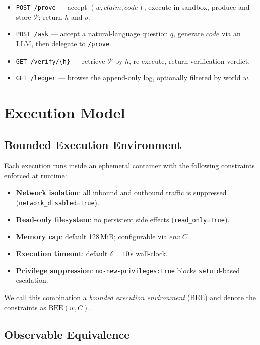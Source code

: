 \documentclass[11pt]{article}
\begin{document}
\begin{itemize}
  \item \texttt{POST /prove} — accept $(w, \textit{claim}, \textit{code})$,
        execute in sandbox, produce and store $\mathcal{P}$; return $h$ and
        $\sigma$.
  \item \texttt{POST /ask} — accept a natural-language question $q$,
        generate $\textit{code}$ via an LLM, then delegate to
        \texttt{/prove}.
  \item \texttt{GET /verify/\{h\}} — retrieve $\mathcal{P}$ by $h$,
        re-execute, return verification verdict.
  \item \texttt{GET /ledger} — browse the append-only log, optionally
        filtered by world $w$.
\end{itemize}

\section{Execution Model}
\label{sec:execution}

\subsection{Bounded Execution Environment}

Each execution runs inside an ephemeral container with the following
constraints enforced at runtime:

\begin{itemize}
  \item \textbf{Network isolation}: all inbound and outbound traffic is
        suppressed (\texttt{network\_disabled=True}).
  \item \textbf{Read-only filesystem}: no persistent side effects
        (\texttt{read\_only=True}).
  \item \textbf{Memory cap}: default 128\,MiB; configurable via
        $\textit{env}.C$.
  \item \textbf{Execution timeout}: default $\delta = 10$\,s wall-clock.
  \item \textbf{Privilege suppression}: \texttt{no-new-privileges:true}
        blocks \texttt{setuid}-based escalation.
\end{itemize}

We call this combination a \emph{bounded execution environment} (BEE)
and denote the constraints as $\mathrm{BEE}(w, C)$.

\subsection{Observable Equivalence}
\label{sec:equivalence}
\end{document}
